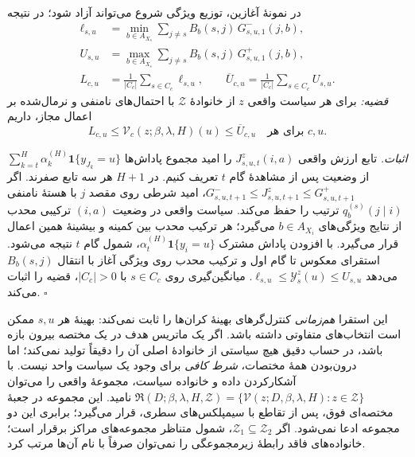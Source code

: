 در نمونهٔ آغازین، توزیع ویژگی شروع می‌تواند آزاد شود؛ در نتیجه
\begin{equation}\label{eq:app-ch3-feasibility-bound}
\boxed{\begin{aligned}
\ell_{s,u}
&=\min_{b\in A_{X_s}}\sum_{j\ne s}B_b(s,j)\,G_{s,u,1}^{-}(j,b),\\
U_{s,u}
&=\max_{b\in A_{X_s}}\sum_{j\ne s}B_b(s,j)\,G_{s,u,1}^{+}(j,b),\\
L_{c,u}&=\frac{1}{|C_c|}\sum_{s\in C_c}\ell_{s,u},\qquad
\overline U_{c,u}=\frac{1}{|C_c|}\sum_{s\in C_c}U_{s,u}.
\end{aligned}}
\end{equation}
\emph{قضیه:} برای هر سیاست واقعی $z$ از خانوادهٔ
$\mathcal Z$ با احتمال‌های نامنفی و نرمال‌شده بر اعمال مجاز، داریم
\[
\boxed{L_{c,u}\le\mathcal V_c(z;\beta,\lambda,H)(u)
\le\overline U_{c,u}\quad\text{برای هر }c,u.}
\]

\emph{اثبات.}
تابع ارزش واقعی $J^z_{s,u,t}(i,a)$ را امید مجموع پاداش‌ها
$\sum_{k=t}^{H}\alpha_k^{(H)}\mathbf1\{y_{J_k}=u\}$
از وضعیت پس از مشاهدهٔ گام $t$ تعریف کنیم. در $H+1$ هر سه
تابع صفرند. اگر
$G^-_{s,u,t+1}\le J^z_{s,u,t+1}\le G^+_{s,u,t+1}$،
امید شرطی روی مقصد $j$ با هستهٔ نامنفی
$q_b^{(s)}(j\mid i)$ ترتیب را حفظ می‌کند.
سیاست واقعی در وضعیت $(i,a)$ ترکیبی محدب از نتایج ویژگی‌های
$b\in A_{X_i}$ می‌گیرد؛ هر ترکیب محدب بین کمینه و بیشینهٔ
همین اعمال قرار می‌گیرد. با افزودن پاداش مشترک
$\alpha_t^{(H)}\mathbf1\{y_i=u\}$، شمول گام $t$
نتیجه می‌شود. استقرای معکوس تا گام اول و ترکیب محدب روی ویژگی
آغاز با انتقال $B_b(s,j)$ می‌دهد
$\ell_{s,u}\le\mathscr Y_s^z(u)\le U_{s,u}$.
میانگین‌گیری روی $s\in C_c$ با $|C_c|>0$،
قضیه را اثبات می‌کند. \(\square\)

این استقرا \emph{هم‌زمانی} کنترل‌گرهای بهینهٔ کران‌ها را
ثابت نمی‌کند: بهینهٔ هر $s,u$ ممکن است انتخاب‌های متفاوتی داشته باشد.
اگر یک ماتریس هدف در یک مختصه بیرون بازه باشد، در حساب دقیق
هیچ سیاستی از خانوادهٔ اصلی آن را دقیقاً تولید نمی‌کند؛ اما
درون‌بودن همهٔ مختصات، \emph{شرط کافی} برای وجود یک سیاست واحد نیست.
با آشکارکردن داده و خانواده سیاست، مجموعهٔ واقعی را می‌توان
$\mathfrak R(D;\beta,\lambda,H,\mathcal Z)
=\{\mathcal V(z;D,\beta,\lambda,H):z\in\mathcal Z\}$
نامید. این مجموعه در جعبهٔ مختصه‌ای فوق، پس از تقاطع
با سیمپلکس‌های سطری، قرار می‌گیرد؛ برابری این دو مجموعه ادعا نمی‌شود.
اگر $\mathcal Z_1\subseteq\mathcal Z_2$، شمول متناظر
مجموعه‌های مراکز برقرار است؛ خانواده‌های فاقد رابطهٔ زیرمجموعگی
را نمی‌توان صرفاً با نام آن‌ها مرتب کرد.

